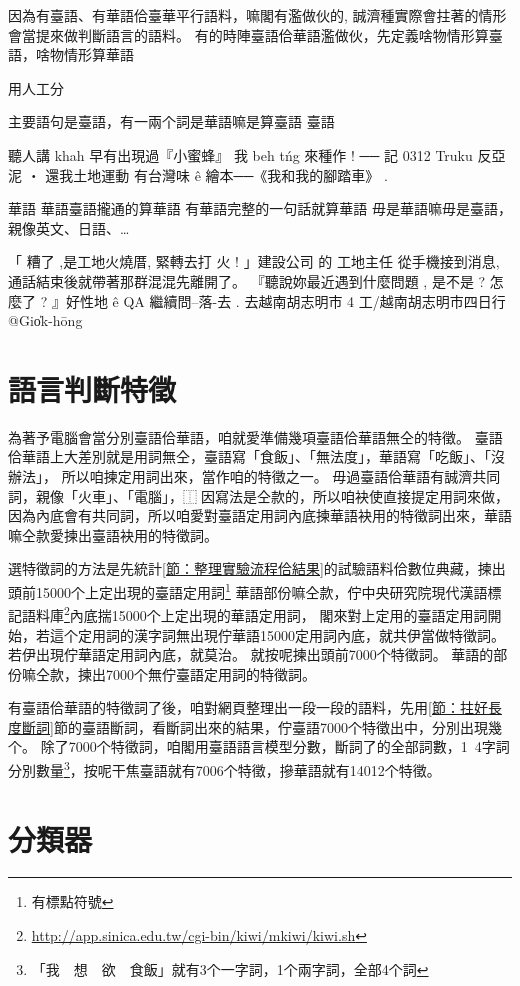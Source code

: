 \documentclass[final,oneside,onecolumn,12pt,a4paper]{book}%
\begin{document}
因為有臺語、有華語佮臺華平行語料，嘛閣有濫做伙的, 誠濟種實際會拄著的情形會當提來做判斷語言的語料。
有的時陣臺語佮華語濫做伙，先定義啥物情形算臺語，啥物情形算華語

用人工分

主要語句是臺語，有一兩个詞是華語嘛是算臺語
臺語

聽人講 khah 早有出現過『小蜜蜂』
我 beh tńg 來種作 ! ── 記 0312 Truku 反亞泥 ‧ 還我土地運動
有台灣味 ê 繪本──《我和我的腳踏車》 .

華語
華語臺語攏通的算華語
有華語完整的一句話就算華語
毋是華語嘛毋是臺語，親像英文、日語、…

「 糟了 ,是工地火燒厝, 緊轉去打 火 ! 」建設公司 的 工地主任 從手機接到消息,通話結束後就帶著那群混混先離開了。
『聽說妳最近遇到什麼問題 , 是不是 ? 怎麼了 ? 』好性地 ê QA 繼續問--落-去 .
去越南胡志明市 4 工/越南胡志明市四日行 @Gio̍k-hōng


\section{語言判斷特徵}
\label{節：語言判斷特徵}
為著予電腦會當分別臺語佮華語，咱就愛準備幾項臺語佮華語無仝的特徵。
臺語佮華語上大差別就是用詞無仝，臺語寫「食飯」、「無法度」，華語寫「吃飯」、「沒辦法」，
所以咱揀定用詞出來，當作咱的特徵之一。
毋過臺語佮華語有誠濟共同詞，親像「火車」、「電腦」，⿰因寫法是仝款的，所以咱袂使直接提定用詞來做，因為內底會有共同詞，所以咱愛對臺語定用詞內底揀華語袂用的特徵詞出來，華語嘛仝款愛揀出臺語袂用的特徵詞。

選特徵詞的方法是先統計\ref{節：整理實驗流程佮結果}的試驗語料佮數位典藏，揀出頭前15000个上定出現的臺語定用詞\footnote{有標點符號}
華語部份嘛仝款，佇中央研究院現代漢語標記語料庫\footnote{\url{http://app.sinica.edu.tw/cgi-bin/kiwi/mkiwi/kiwi.sh}}內底揣15000个上定出現的華語定用詞，
閣來對上定用的臺語定用詞開始，若這个定用詞的漢字詞無出現佇華語15000定用詞內底，就共伊當做特徵詞。
若伊出現佇華語定用詞內底，就莫治。
就按呢揀出頭前7000个特徵詞。
華語的部份嘛仝款，揀出7000个無佇臺語定用詞的特徵詞。


有臺語佮華語的特徵詞了後，咱對網頁整理出一段一段的語料，先用\ref{節：拄好長度斷詞}節的臺語斷詞，看斷詞出來的結果，佇臺語7000个特徵出中，分別出現幾个。
除了7000个特徵詞，咱閣用臺語語言模型分數，斷詞了的全部詞數，1~4字詞分別數量\footnote{「我　想　欲　食飯」就有3个一字詞，1个兩字詞，全部4个詞}，按呢干焦臺語就有7006个特徵，摻華語就有14012个特徵。

\section{分類器}
\label{節：分類器}
\end{document}
